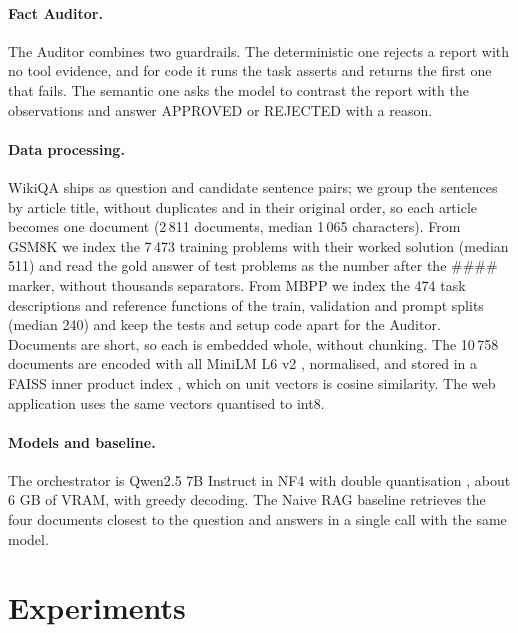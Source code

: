 \documentclass{article}
\begin{document}
\paragraph{Fact Auditor.}
The Auditor combines two guardrails. The deterministic one rejects a report with no tool evidence, and for code it runs the task asserts and returns the first one that fails. The semantic one asks the model to contrast the report with the observations and answer APPROVED or REJECTED with a reason.

\paragraph{Data processing.}
WikiQA \citep{yang2015wikiqa} ships as question and candidate sentence pairs; we group the sentences by article title, without duplicates and in their original order, so each article becomes one document (2\,811 documents, median 1\,065 characters). From GSM8K \citep{cobbe2021gsm8k} we index the 7\,473 training problems with their worked solution (median 511) and read the gold answer of test problems as the number after the \#\#\#\# marker, without thousands separators. From MBPP \citep{austin2021mbpp} we index the 474 task descriptions and reference functions of the train, validation and prompt splits (median 240) and keep the tests and setup code apart for the Auditor. Documents are short, so each is embedded whole, without chunking. The 10\,758 documents are encoded with all MiniLM L6 v2 \citep{reimers2019sbert}, normalised, and stored in a FAISS inner product index \citep{johnson2019faiss}, which on unit vectors is cosine similarity. The web application uses the same vectors quantised to int8.

\paragraph{Models and baseline.}
The orchestrator is Qwen2.5 7B Instruct \citep{qwen2025} in NF4 with double quantisation \citep{dettmers2023qlora}, about 6 GB of VRAM, with greedy decoding. The Naive RAG baseline retrieves the four documents closest to the question and answers in a single call with the same model.

\section{Experiments}
\end{document}
